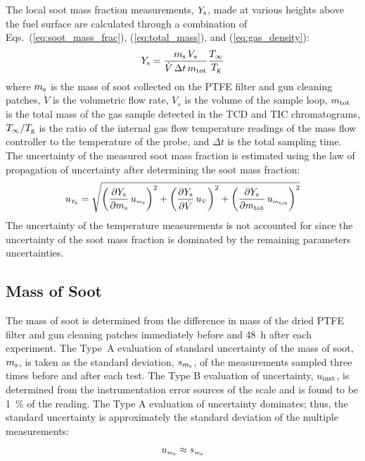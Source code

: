 \documentclass[12pt]{article}
\begin{document}
The local soot mass fraction measurements, $Y_{\rm s}$, made at various heights above the fuel surface are calculated through a combination of Eqs.~(\ref{eq:soot_mass_frac}), (\ref{eq:total_mass}), and (\ref{eq:gas_density}):
\begin{equation}\label{eq:overall_soot_mass_frac}
Y_{\rm s}= \frac{m_{\rm s} \, V_{s}}{\dot{V} \, \Delta t \, m_{\rm tot}}\frac{T_{\rm \infty}}{T_{\rm g}}
\end{equation}
where $m_{\rm s}$ is the mass of soot collected on the PTFE filter and gun cleaning patches, $\dot{V}$ is the volumetric flow rate, $V_{s}$ is the volume of the sample loop, $m_{\rm tot}$ is the total mass of the gas sample detected in the TCD and TIC chromatograms, $T_{\rm \infty}/T_{\rm g}$ is the ratio of the internal gas flow temperature readings of the mass flow controller to the temperature of the probe, and $\Delta t$ is the total sampling time. The uncertainty of the measured soot mass fraction is estimated using the law of propagation of uncertainty after determining the soot mass fraction:
\begin{equation}
\label{eq:soot_mass_frac_uncertainty}
u_{\scriptscriptstyle Y_{\rm s}} = \sqrt{{\left(\frac{\partial Y_{\rm s}}{\partial m_{\rm s}}\,u_{\scriptscriptstyle m_{\rm s}} \right)}^2+{\left(\frac{\partial Y_{\rm s}}{\partial \dot{V} }\,u_{\scriptscriptstyle \dot{V}} \right)}^2+{\left(\frac{\partial Y_{\rm s}}{\partial m_{\rm tot}}\,u_{\scriptscriptstyle m_{\rm tot}} \right)}^2}
\end{equation}
The uncertainty of the temperature measurements is not accounted for since the uncertainty of the soot mass fraction is dominated by the remaining parameters uncertainties.

\subsection{Mass of Soot}
\label{ssec:Mass_of_Soot}

The mass of soot is determined from the difference in mass of the dried PTFE filter and gun cleaning patches immediately before and 48~h after each experiment. The Type~A evaluation of standard uncertainty of the mass of soot, $m_{\rm s}$, is taken as the standard deviation, $s_{m_{\rm s}}$, of the measurements sampled three times before and after each test. The Type B evaluation of uncertainty, $u_{\rm inst}$, is determined from the instrumentation error sources of the scale and is found to be 1~\% of the reading. The Type A evaluation of uncertainty dominates; thus, the standard uncertainty is approximately the standard deviation of the multiple measurements:
\begin{equation}
\label{eq:soot_mass_uncertainty}
u_{\scriptscriptstyle m_{\rm s}}\approx s_{\scriptscriptstyle m_{\rm s}}
\end{equation}
\end{document}
